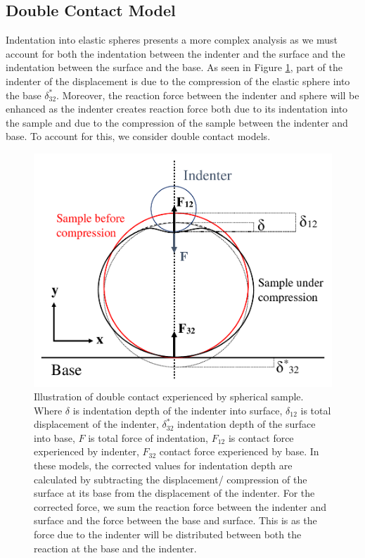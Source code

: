 \subsection{Double Contact Model\label{Appendix: Double Contact}}

Indentation into elastic spheres presents a more complex analysis as we must account for both the indentation between the indenter and the surface and the indentation between the surface and the base. As seen in Figure \ref{fig: Double Contact}, part of the indenter of the displacement is due to the compression of the elastic sphere into the base $\delta^*_{32}$. Moreover, the reaction force between the indenter and sphere will be enhanced as the indenter creates reaction force both due to its indentation into the sample and due to the compression of the sample between the indenter and base. To account for this, we consider double contact models\cite{dokukin2013quantitative,glaubitz2014novel}. 

\begin{figure}[H]
    \centering
    \includegraphics[width=0.6\linewidth]{Figures/Double Contact.pdf}
    \caption{\label{fig: Double Contact} Illustration of double contact experienced by spherical sample.  Where $\delta$ is indentation depth of the indenter into surface, $\delta_{12}$ is total displacement of the indenter, $\delta^*_{32}$ indentation depth of the surface into base, $F$ is total force of indentation, $F_{12}$ is contact force experienced by indenter, $F_{32}$ contact force experienced by base. In these models, the corrected values for indentation depth are calculated by subtracting the displacement/ compression of the surface at its base from the displacement of the indenter. For the corrected force, we sum the reaction force between the indenter and surface and the force between the base and surface. This is as the force due to the indenter will be distributed between both the reaction at the base and the indenter. }
\end{figure}

